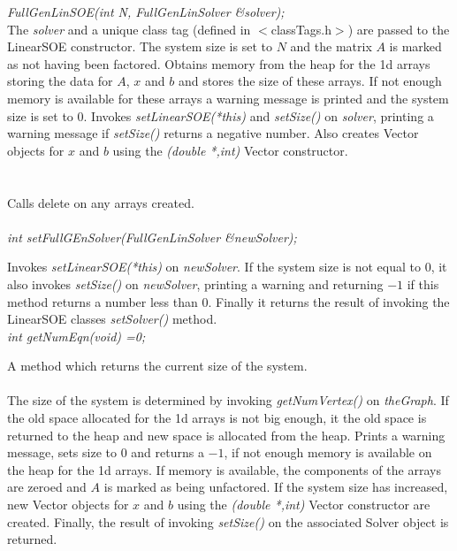 {\em FullGenLinSOE(int N, FullGenLinSolver \&solver); }\\
The {\em solver} and a unique class tag (defined in $<$classTags.h$>$)
are passed to the LinearSOE constructor. The system size is set
to $N$ and the matrix $A$ is marked as not having been
factored. Obtains memory from the heap for the 1d arrays storing the
data for $A$, $x$ and $b$ and stores the size of these arrays. If not
enough memory is available for these arrays a warning message is
printed and the system size is set to $0$. Invokes {\em
setLinearSOE(*this)} and {\em setSize()} on {\em solver},
printing a warning message if {\em setSize()} returns a negative
number. Also creates Vector objects for $x$ and $b$ using the {\em
(double *,int)} Vector constructor. \\

 \\
\\ 
Calls delete on any arrays created. \\

 \\
{\em  int setFullGEnSolver(FullGenLinSolver \&newSolver);}

Invokes {\em setLinearSOE(*this)} on {\em newSolver}.
If the system size is not equal to $0$, it also invokes {\em setSize()}
on {\em newSolver}, printing a warning and returning $-1$ if this
method returns a number less than $0$. Finally it returns the result
of invoking the LinearSOE classes {\em setSolver()} method. \\

{\em int getNumEqn(void) =0; } 

A method which returns the current size of the system. \\

 \\ 
The size of the system is determined by invoking {\em getNumVertex()}
on {\em theGraph}. If the old space allocated for the 1d arrays is not
big enough, it the old space is returned to the heap and new space is
allocated from the heap. Prints a warning message, sets size to $0$
and returns a $-1$, if not enough memory is available on the heap for the 
1d arrays. If memory is available, the components of the arrays are
zeroed and $A$ is marked as being unfactored. If the system size has
increased, new Vector objects for $x$ and $b$ using the {\em (double
*,int)} Vector constructor are created. Finally, the result of
invoking {\em setSize()} on the associated Solver object is returned. \\


